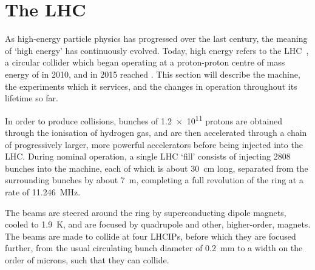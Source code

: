 \chapter{The \acl{LHC}}
\label{chap:intro:lhc}

As high-energy particle physics has progressed over the last century, the 
meaning of `high energy' has continuously evolved.
Today, high energy refers to the \acl{LHC}~\cite{Bruning:2004ej}, a circular 
collider which began operating at a proton-proton centre of mass energy of 
 in 2010, and in 2015 reached .
This section will describe the machine, the experiments which it services, and 
the changes in operation throughout its lifetime so far.

In order to produce collisions, bunches of \num{1.2e11} protons are obtained 
through the ionisation of hydrogen gas, and are then accelerated through a 
chain of progressively larger, more powerful accelerators before being injected 
into the \ac{LHC}.
During nominal operation, a single \ac{LHC} `fill' consists of injecting 2808 
bunches into the machine, each of which is about \SI{30}{\centi\metre} long, 
separated from the surrounding bunches by about \SI{7}{\metre}, completing a 
full revolution of the ring at a rate of \SI{11.246}{\mega\hertz}.

The beams are steered around the ring by superconducting dipole magnets, cooled 
to \SI{1.9}{\kelvin}, and are focused by quadrupole and other, higher-order, 
magnets.
The beams are made to collide at four \acp{LHCIP}, before which they are 
focused further, from the usual circulating bunch diameter of 
\SI{0.2}{\milli\metre} to a width on the order of microns, such that they can 
collide.

